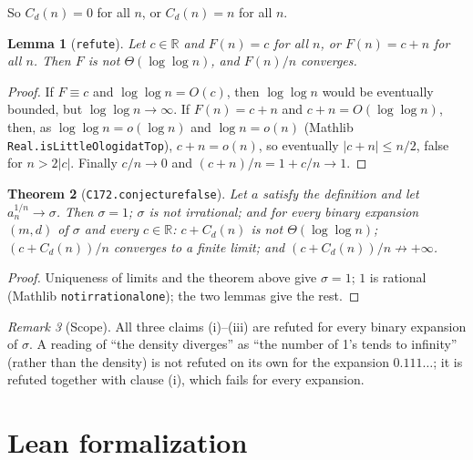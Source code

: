 \documentclass[11pt]{article}
\newtheorem{theorem}{Theorem}
\newtheorem{lemma}[theorem]{Lemma}
\theoremstyle{definition}
\theoremstyle{remark}
\newtheorem{remark}[theorem]{Remark}
\renewcommand{\_}{\oldus\allowbreak}
\begin{document}
So $C_d(n) = 0$ for all $n$, or $C_d(n) = n$ for all $n$.

\begin{lemma}[\texttt{refute}]
Let $c\in\mathbb R$ and $F(n) = c$ for all $n$, or $F(n) = c+n$ for all $n$. Then $F$ is not
$\Theta(\log\log n)$, and $F(n)/n$ converges.
\end{lemma}
\begin{proof}
If $F \equiv c$ and $\log\log n = O(c)$, then $\log\log n$ would be eventually bounded, but
$\log\log n\to\infty$. If $F(n) = c+n$ and $c + n = O(\log\log n)$, then, as
$\log\log n = o(\log n)$ and $\log n = o(n)$ (Mathlib \texttt{Real.isLittleO\_log\_id\_atTop}),
$c + n = o(n)$, so eventually $|c+n|\le n/2$, false for $n > 2|c|$. Finally $c/n\to0$ and
$(c+n)/n = 1 + c/n\to 1$.
\end{proof}

\begin{theorem}[\texttt{C172.conjecture\_172\_false}]
Let $a$ satisfy the definition and let $a_n^{1/n}\to\sigma$. Then $\sigma = 1$; $\sigma$ is not irrational;
and for every binary expansion $(m,d)$ of $\sigma$ and every $c \in \mathbb R$: $c + C_d(n)$ is not
$\Theta(\log\log n)$; $(c + C_d(n))/n$ converges to a finite limit; and $(c + C_d(n))/n\not\to+\infty$.
\end{theorem}
\begin{proof}
Uniqueness of limits and the theorem above give $\sigma=1$; $1$ is rational (Mathlib
\texttt{not\_irrational\_one}); the two lemmas give the rest.
\end{proof}

\begin{remark}[Scope]
All three claims (i)--(iii) are refuted for every binary expansion of $\sigma$. A reading of ``the density
diverges'' as ``the number of 1's tends to infinity'' (rather than the density) is not refuted on its own
for the expansion $0.111\ldots$; it is refuted together with clause (i), which fails for every expansion.
\end{remark}

\section{Lean formalization}
\end{document}
